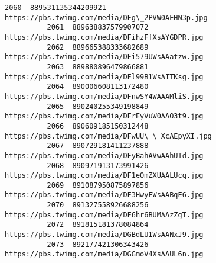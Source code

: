 \documentclass[11pt]{article}
\begin{document}
\begin{Verbatim}[commandchars=\\\{\}]
          2060  889531135344209921    https://pbs.twimg.com/media/DFg\_2PVW0AEHN3p.jpg   
          2061  889638837579907072    https://pbs.twimg.com/media/DFihzFfXsAYGDPR.jpg   
          2062  889665388333682689    https://pbs.twimg.com/media/DFi579UWsAAatzw.jpg   
          2063  889880896479866881    https://pbs.twimg.com/media/DFl99B1WsAITKsg.jpg   
          2064  890006608113172480    https://pbs.twimg.com/media/DFnwSY4WAAAMliS.jpg   
          2065  890240255349198849    https://pbs.twimg.com/media/DFrEyVuW0AAO3t9.jpg   
          2066  890609185150312448    https://pbs.twimg.com/media/DFwUU\_\_XcAEpyXI.jpg   
          2067  890729181411237888    https://pbs.twimg.com/media/DFyBahAVwAAhUTd.jpg   
          2068  890971913173991426    https://pbs.twimg.com/media/DF1eOmZXUAALUcq.jpg   
          2069  891087950875897856    https://pbs.twimg.com/media/DF3HwyEWsAABqE6.jpg   
          2070  891327558926688256    https://pbs.twimg.com/media/DF6hr6BUMAAzZgT.jpg   
          2072  891815181378084864    https://pbs.twimg.com/media/DGBdLU1WsAANxJ9.jpg   
          2073  892177421306343426    https://pbs.twimg.com/media/DGGmoV4XsAAUL6n.jpg   
          

\end{Verbatim}
\end{document}
